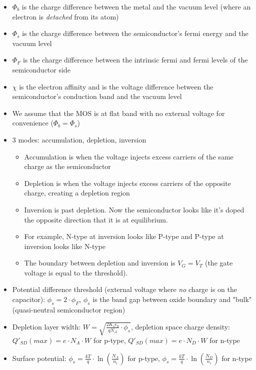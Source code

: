 \documentclass{article}
\begin{document}
\begin{itemize}
    \item $\Phi_b$ is the charge difference between the metal and the vacuum level (where an electron is \textit{detached} from its atom)
    \item $\Phi_s$ is the charge difference between the semiconductor's fermi energy and the vacuum level
    \item $\Phi_F$ is the charge difference between the intrinsic fermi and fermi levels of the semiconductor side
    \item $\chi$ is the electron affinity and is the voltage difference between the semiconductor's conduction band and the vacuum level
    \item We assume that the MOS is at flat band with no external voltage for convenience ($\Phi_b = \Phi_s$)
    \item 3 modes: accumulation, depletion, inversion
    \begin{itemize}
        \item Accumulation is when the voltage injects excess carriers of the same charge as the semiconductor
        \item Depletion is when the voltage injects excess carriers of the opposite charge, creating a depletion region
        \item Inversion is past depletion. Now the semiconductor looks like it's doped the opposite direction that it is at equilibrium.
        \item For example, N-type at inversion looks like P-type and P-type at inversion looks like N-type
        \item The boundary between depletion and inversion is $V_G = V_T$ (the gate voltage is equal to the threshold).
    \end{itemize}
    \item Potential difference threshold (external voltage where \textit{no} charge is on the capacitor): $\phi_s = 2 \cdot \phi_F$, $\phi_s$ is the band gap between oxide boundary and "bulk" (quasi-neutral semiconductor region)
    \item Depletion layer width: $W = \sqrt{\frac{2 K_s \epsilon_0}{q N_A} \cdot \phi_s}$, depletion space charge density: $Q'_{SD}(max) = e \cdot N_A \cdot W$ for p-type, $Q'_{SD}(max) = e \cdot N_D \cdot W$ for n-type
    \item Surface potential: $\phi_s = \frac{kT}{q} \cdot \ln\left(\frac{N_A}{n_i}\right)$ for p-type, $\phi_s = \frac{kT}{q} \cdot \ln\left(\frac{N_D}{n_i}\right)$ for n-type
\end{itemize}
\end{document}
